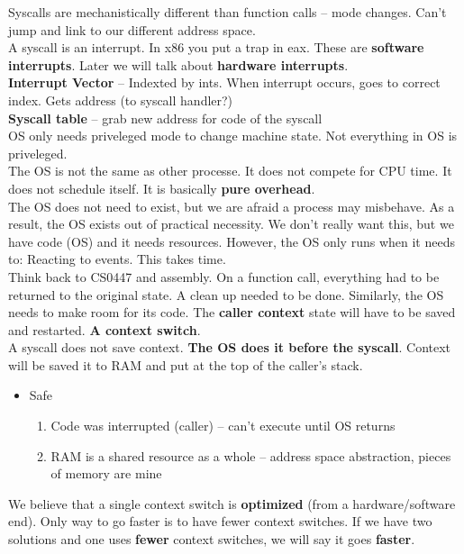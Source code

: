 \documentclass[../base_file/cs1550_notes.tex]{subfiles}
\begin{document}
Syscalls are mechanistically different than function calls -- mode changes.  Can't jump and link to our
different address space.\\

A syscall is an interrupt.  In x86 you put a trap in eax.  These are \textbf{software interrupts}. Later
we will talk about \textbf{hardware interrupts}.\\

\textbf{Interrupt Vector} -- Indexted by ints.  When interrupt occurs, goes to correct index.  Gets
address (to syscall handler?)\\

\textbf{Syscall table} -- grab new address for code of the syscall\\

OS only needs priveleged mode to change machine state.  Not everything in OS is priveleged.\\

The OS is not the same as other processe.  It does not compete for CPU time.  It does not schedule itself.
It is basically \textbf{pure overhead}.\\

The OS does not need to exist, but we are afraid a process may misbehave.  As a result, the OS exists out
of practical necessity.  We don't really want this, but we have code (OS) and it needs resources. However,
the OS only runs when it needs to: Reacting to events.  This takes time.\\

Think back to CS0447 and assembly.  On a function call, everything had to be returned to the original
state.  A clean up needed to be done.  Similarly, the OS needs to make room for its code.
The \textbf{caller context} state will have to be saved and restarted.  \textbf{A context switch}.\\

A syscall does not save context.  \textbf{The OS does it before the syscall}.  Context will be saved it
to RAM and put at the top of the caller's stack.
	\begin{itemize}
	\item Safe
		\begin{enumerate}
		\item Code was interrupted (caller) -- can't execute until OS returns
		\item RAM is a shared resource as a whole -- address space abstraction, pieces of memory are
			  mine
		\end{enumerate}
	\end{itemize}
We believe that a single context switch is \textbf{optimized}  (from a hardware/software end).  Only
way to go faster is to have fewer context switches.  If we have two solutions and one uses \textbf{fewer}
context switches, we will say it goes \textbf{faster}.\\
\end{document}
